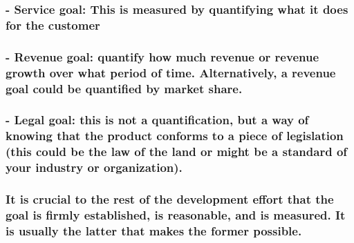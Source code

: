 \documentclass[
]{article}
\begin{document}
\hypertarget{service-goal-this-is-measured-by-quantifying-what-it-does-for-the-customer}{%
\subsubsection{- Service goal: This is measured by quantifying what it
does for the
customer}\label{service-goal-this-is-measured-by-quantifying-what-it-does-for-the-customer}}

\hypertarget{revenue-goal-quantify-how-much-revenue-or-revenue-growth-over-what-period-of-time.-alternatively-a-revenue-goal-could-be-quantified-by-market-share.}{%
\subsubsection{\texorpdfstring{- Revenue goal: quantify how much revenue
or revenue growth over what period of time. Alternatively, a revenue
goal could be quantified by market share.
}{- Revenue goal: quantify how much revenue or revenue growth over what period of time. Alternatively, a revenue goal could be quantified by market share. }}\label{revenue-goal-quantify-how-much-revenue-or-revenue-growth-over-what-period-of-time.-alternatively-a-revenue-goal-could-be-quantified-by-market-share.}}

\hypertarget{legal-goal-this-is-not-a-quantification-but-a-way-of-knowing-that-the-product-conforms-to-a-piece-of-legislation-this-could-be-the-law-of-the-land-or-might-be-a-standard-of-your-industry-or-organization.}{%
\subsubsection{\texorpdfstring{- Legal goal: this is not a
quantification, but a way of knowing that the product conforms to a
piece of legislation (this could be the law of the land or might be a
standard of your industry or organization).
}{- Legal goal: this is not a quantification, but a way of knowing that the product conforms to a piece of legislation (this could be the law of the land or might be a standard of your industry or organization). }}\label{legal-goal-this-is-not-a-quantification-but-a-way-of-knowing-that-the-product-conforms-to-a-piece-of-legislation-this-could-be-the-law-of-the-land-or-might-be-a-standard-of-your-industry-or-organization.}}

\hypertarget{it-is-crucial-to-the-rest-of-the-development-effort-that-the-goal-is-firmly-established-is-reasonable-and-is-measured.-it-is-usually-the-latter-that-makes-the-former-possible.}{%
\subsubsection{\texorpdfstring{It is crucial to the rest of the
development effort that the goal is firmly established, is reasonable,
and is measured. It is usually the latter that makes the former
possible.
}{It is crucial to the rest of the development effort that the goal is firmly established, is reasonable, and is measured. It is usually the latter that makes the former possible. }}\label{it-is-crucial-to-the-rest-of-the-development-effort-that-the-goal-is-firmly-established-is-reasonable-and-is-measured.-it-is-usually-the-latter-that-makes-the-former-possible.}}
\end{document}
